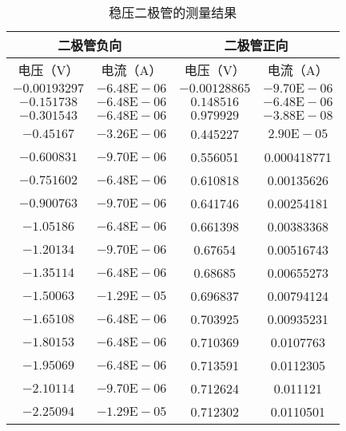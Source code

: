 \documentclass[UTF8]{article}
\theoremstyle{MyLineTheoremStyle} %
\theoremstyle{MyBlockTheoremStyle} %
\theoremstyle{MySubsubsectionStyle} %
\begin{document}
\begin{table}[H]
    \centering
    \begin{tabular}{|c|c|c|c|}
        \hline
        \multicolumn{2}{|c|}{二极管负向} & \multicolumn{2}{|c|}{二极管正向}\\
        \hline
        电压（V） & 电流（A） & 电压（V） & 电流（A）\\
        \hline
        $ -0.00193297 $ & $ -6.48\mathrm E-06 $ & $ -0.00128865 $ & $ -9.70\mathrm E-06 $\\
        \hline
        $ -0.151738 $ & $ -6.48\mathrm E-06 $ & $ 0.148516 $ & $ -6.48\mathrm E-06 $\\
        \hline
        $ -0.301543 $ & $ -6.48\mathrm E-06 $ & $ 0.979929 $ & $ -3.88\mathrm E-08 $\\
        \hline
        $ -0.45167 $ & $ -3.26\mathrm E-06 $ & 0.445227 & $ 2.90\mathrm E-05 $\\
        \hline
        $ -0.600831 $ & $ -9.70\mathrm E-06 $ & 0.556051 & 0.000418771\\
        \hline
        $ -0.751602 $ & $ -6.48\mathrm E-06 $ & 0.610818 & 0.00135626\\
        \hline
        $ -0.900763 $ & $ -9.70\mathrm E-06 $ & 0.641746 & 	0.00254181\\
        \hline
        $ -1.05186 $ &	$ -6.48\mathrm E-06 $&	0.661398&	0.00383368\\
        \hline
        $ -1.20134 $&	$ -9.70\mathrm E-06 $&	0.67654	&0.00516743\\
        \hline
        $ -1.35114 $&	$ -6.48\mathrm E-06 $& 	0.68685	&0.00655273\\
        \hline
        $ -1.50063 $&	$ -1.29\mathrm E-05 $&	0.696837&	0.00794124\\
        \hline
        $ -1.65108 $&	$ -6.48\mathrm E-06 $&	0.703925&	0.00935231\\
        \hline
        $ -1.80153 $&	$ -6.48\mathrm E-06 $	&0.710369&	0.0107763\\
        \hline
        $ -1.95069 $&	$ -6.48\mathrm E-06 $&	0.713591&	0.0112305\\
        \hline
        $ -2.10114 $&	$ -9.70\mathrm E-06 $&	0.712624&	0.011121\\
        \hline
        $ -2.25094 $&	$ -1.29\mathrm E-05 $&	0.712302&	0.0110501\\
        \hline			
    \end{tabular}
    \caption{\small 稳压二极管的测量结果}
\end{table}
\end{document}
